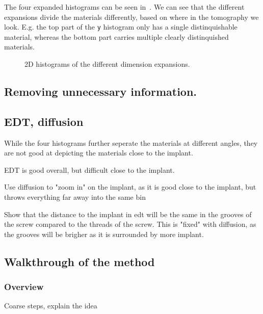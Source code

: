 The four expanded histograms can be seen in~. 
We can see that the different expansions divide the materials differently, based on where in the tomography we look.
E.g. the top part of the \texttt{y} histogram only has a single distinquishable material, whereas the bottom part carries multiple clearly distinquished materials. 

\begin{figure}
    \centering
    \caption{2D histograms of the different dimension expansions.}
    \label{fig:2dhists}
\end{figure}

\subsection{Removing unnecessary information.}

\subsection{EDT, diffusion}
While the four histograms further seperate the materials at different angles, they are not good at depicting the materials close to the implant.


EDT is good overall, but difficult close to the implant. 

Use diffusion to "zoom in" on the implant, as it is good close to the implant, but throws everything far away into the same bin

Show that the distance to the implant in edt will be the same in the grooves of the screw compared to the threads of the screw. This is "fixed" with diffusion, as the grooves will be brigher as it is surrounded by more implant.

\subsection{Walkthrough of the method}

\subsubsection{Overview}
Coarse steps, explain the idea

